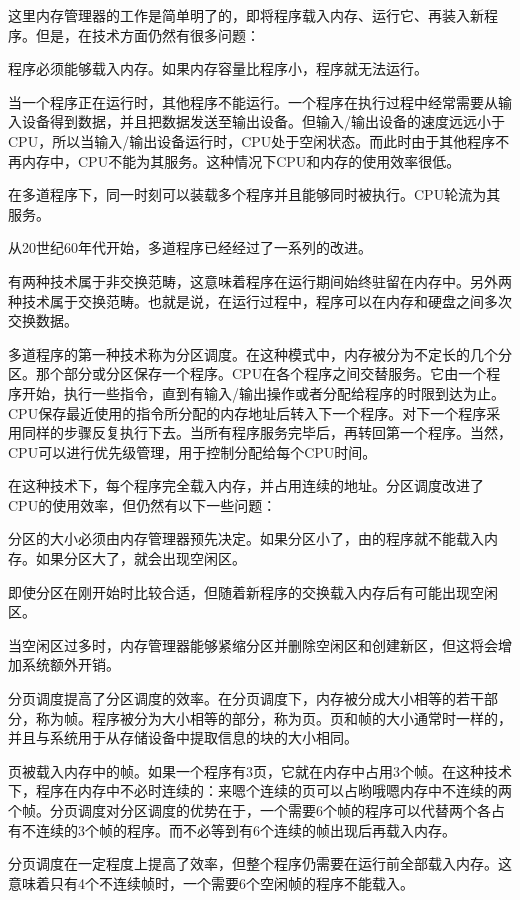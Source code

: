 这里内存管理器的工作是简单明了的，即将程序载入内存、运行它、再装入新程序。但是，在技术方面仍然有很多问题：

程序必须能够载入内存。如果内存容量比程序小，程序就无法运行。

当一个程序正在运行时，其他程序不能运行。一个程序在执行过程中经常需要从输入设备得到数据，并且把数据发送至输出设备。但输入/输出设备的速度远远小于CPU，所以当输入/输出设备运行时，CPU处于空闲状态。而此时由于其他程序不再内存中，CPU不能为其服务。这种情况下CPU和内存的使用效率很低。

在多道程序下，同一时刻可以装载多个程序并且能够同时被执行。CPU轮流为其服务。

从20世纪60年代开始，多道程序已经经过了一系列的改进。

有两种技术属于非交换范畴，这意味着程序在运行期间始终驻留在内存中。另外两种技术属于交换范畴。也就是说，在运行过程中，程序可以在内存和硬盘之间多次交换数据。

多道程序的第一种技术称为分区调度。在这种模式中，内存被分为不定长的几个分区。那个部分或分区保存一个程序。CPU在各个程序之间交替服务。它由一个程序开始，执行一些指令，直到有输入/输出操作或者分配给程序的时限到达为止。CPU保存最近使用的指令所分配的内存地址后转入下一个程序。对下一个程序采用同样的步骤反复执行下去。当所有程序服务完毕后，再转回第一个程序。当然，CPU可以进行优先级管理，用于控制分配给每个CPU时间。

在这种技术下，每个程序完全载入内存，并占用连续的地址。分区调度改进了CPU的使用效率，但仍然有以下一些问题：

分区的大小必须由内存管理器预先决定。如果分区小了，由的程序就不能载入内存。如果分区大了，就会出现空闲区。

即使分区在刚开始时比较合适，但随着新程序的交换载入内存后有可能出现空闲区。

当空闲区过多时，内存管理器能够紧缩分区并删除空闲区和创建新区，但这将会增加系统额外开销。

分页调度提高了分区调度的效率。在分页调度下，内存被分成大小相等的若干部分，称为帧。程序被分为大小相等的部分，称为页。页和帧的大小通常时一样的，并且与系统用于从存储设备中提取信息的块的大小相同。

页被载入内存中的帧。如果一个程序有3页，它就在内存中占用3个帧。在这种技术下，程序在内存中不必时连续的：来嗯个连续的页可以占哟哦嗯内存中不连续的两个帧。分页调度对分区调度的优势在于，一个需要6个帧的程序可以代替两个各占有不连续的3个帧的程序。而不必等到有6个连续的帧出现后再载入内存。

分页调度在一定程度上提高了效率，但整个程序仍需要在运行前全部载入内存。这意味着只有4个不连续帧时，一个需要6个空闲帧的程序不能载入。

